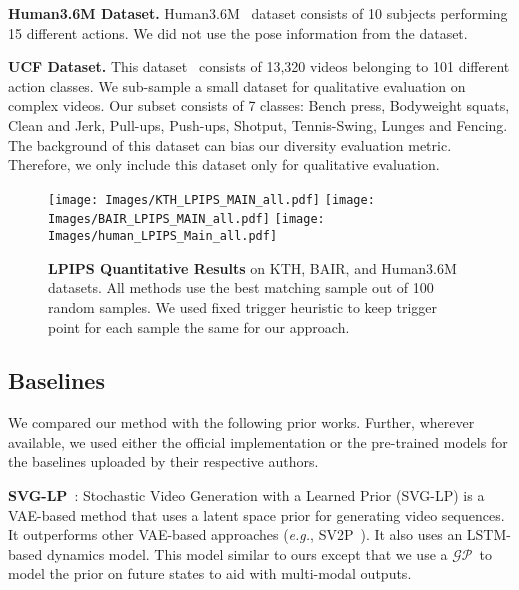 \documentclass{article} \usepackage{iclr2021_conference,times}
\newcommand{\GP}{$\mathcal{GP}$}
\def\eg{\emph{e.g.}}
\begin{document}
\noindent\textbf{Human3.6M Dataset.} Human3.6M~\citep{h36m_pami} dataset consists of 10 subjects performing 15 different actions. We did not use the pose information from the dataset.


\noindent\textbf{UCF Dataset.} This dataset~\citep{soomro2012ucf101} consists of 13,320 videos belonging to 101 different action classes. We sub-sample a small dataset for qualitative evaluation on complex videos. Our subset consists of 7 classes: Bench press, Bodyweight squats, Clean and Jerk, Pull-ups, Push-ups, Shotput, Tennis-Swing, Lunges and Fencing. The background of this dataset can bias our diversity evaluation metric. Therefore, we only include this dataset only for qualitative evaluation.

 
 \begin{figure*}[t]
    \centering

    \texttt{[image: Images/KTH\_LPIPS\_MAIN\_all.pdf]}\quad
    \texttt{[image: Images/BAIR\_LPIPS\_MAIN\_all.pdf]}\quad
    \texttt{[image: Images/human\_LPIPS\_Main\_all.pdf]}

    \caption{\textbf{LPIPS Quantitative Results} on KTH, BAIR, and Human3.6M datasets. All methods use the best matching sample out of 100 random samples. We used fixed trigger heuristic to keep trigger point for each sample the same for our approach.}
    \label{fig:plot_results}
    \vspace{-0.15in}
\end{figure*}
 
\vspace{-0.05in}
\subsection{Baselines}
\vspace{-0.05in}
We compared our method with the following prior works. Further, wherever available, we used either the official implementation or the pre-trained models for the baselines uploaded by their respective authors.

\noindent\textbf{SVG-LP}~\citep{denton2018stochastic}: Stochastic Video Generation with a Learned Prior (SVG-LP) is a VAE-based method that uses a latent space prior for generating video sequences. It outperforms other VAE-based approaches (\eg, SV2P~\citep{babaeizadeh2017stochastic}). It also uses an LSTM-based dynamics model. This model similar to ours except that we use a \GP\ to model the prior on future states to aid with multi-modal outputs.
\end{document}
